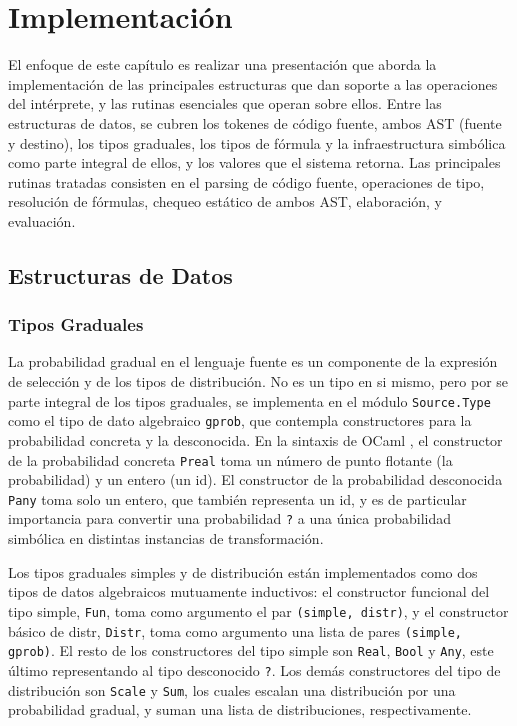 \newpage
\section{Implementación}
\label{sec:implementacion}
El enfoque de este capítulo es realizar una presentación que aborda la implementación de las principales estructuras que dan soporte a las operaciones del intérprete, y las rutinas esenciales que operan sobre ellos. Entre las estructuras de datos, se cubren los tokenes de código fuente, ambos AST (fuente y destino), los tipos graduales, los tipos de fórmula y la infraestructura simbólica como parte integral de ellos, y los valores que el sistema retorna. Las principales rutinas tratadas consisten en el parsing de código fuente, operaciones de tipo, resolución de fórmulas, chequeo estático de ambos AST, elaboración,  y evaluación.

\subsection{Estructuras de Datos}
\subsubsection{Tipos Graduales}

La probabilidad gradual en el lenguaje fuente es un componente de la expresión de selección y de los tipos de distribución. No es un tipo en si mismo, pero por se parte integral de los tipos graduales, se implementa en el módulo \verb|Source.Type| como el tipo de dato  algebraico \verb|gprob|, que contempla constructores para la probabilidad concreta y la desconocida. En la sintaxis de OCaml
, el constructor de la probabilidad concreta \verb|Preal| toma un número de punto flotante (la probabilidad) y un entero (un id). El constructor de la probabilidad desconocida \verb|Pany| toma solo un entero, que también representa un id, y es de particular importancia para convertir una probabilidad \verb|?| a una única probabilidad simbólica en distintas instancias de transformación.

Los tipos graduales simples y de distribución están implementados como dos tipos de datos algebraicos mutuamente inductivos: el constructor funcional del tipo simple, \verb|Fun|, toma como argumento el par \verb|(simple, distr)|, y el constructor básico de distr, \verb|Distr|, toma como argumento una lista de pares \verb|(simple, gprob)|.  El resto de los constructores del tipo simple son
\verb|Real|, \verb|Bool| y \verb|Any|, este último representando al tipo desconocido \verb|?|. Los demás constructores del tipo de distribución son \verb|Scale| y
\verb|Sum|, los cuales escalan una distribución por una probabilidad gradual, y suman una lista de distribuciones, respectivamente.

